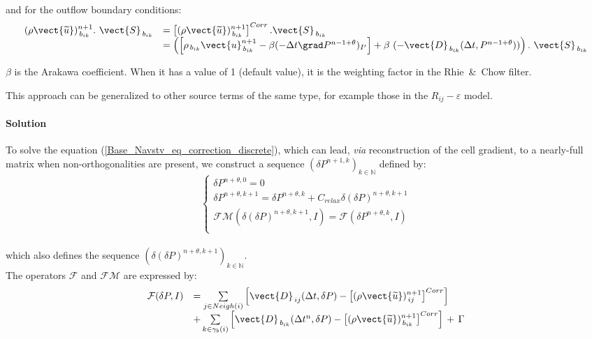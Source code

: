 and for the outflow boundary conditions:
\begin{equation}\notag
\begin{array}{ll}
(\rho \vect{\widetilde{u}})^{n+1}_{\,{b}_{ik}}.\ \vect{S}_{\,b_{ik}}& =
\left[(\rho \vect{\widetilde{u}})^{n+1}_{\,{b}_{ik}}\right]^{Corr}.\vect{S}_{\,b_{ik}}
\\&= \left( \left[\rho _{\,{b}_{ik}}\vect{u}^{n+1}_{\,{b}_{ik}}-\beta(-\Delta t
\grad P^{n-1+\theta})_{I'}\right]+\beta\ (-\vect{D}_{\,{b}_{ik}}(\Delta t,
P^{n-1+\theta}))\right).\ \vect{S}_{\,b_{ik}}
\end{array}
\end{equation}

$\beta$ is the Arakawa coefficient. When it has a value of 1 (default value), it is the weighting factor in the Rhie~\&~Chow filter.


This approach can be generalized to other source terms of the same type,
for example those in the $R_{ij}-\varepsilon$ model.

\paragraph{\bf Solution\\}
To solve the equation (\ref{Base_Navstv_eq_correction_discrete}), which can
lead, {\it via}  reconstruction of the cell gradient, to a nearly-full matrix
when non-orthogonalities are present, we construct a sequence
$(\delta P^{n+1,k})_{k\in \mathbb{N}}$ defined by:
\begin{equation}
\left\{\begin{array}{l}
\delta P^{n+\theta,0} = 0\\
\delta P^{n+\theta,k+1} = \delta P^{n+\theta,k} + C_{relax} \delta (\delta P)^{n+\theta,k+1}\\
\mathcal{FM}(\delta(\delta P)^{n+\theta,k+1},I) = \mathcal{F}(\delta P^{n+\theta,k},I) \\\end{array}\right.
\end{equation}\\
which also defines the sequence $({\delta(\delta P)^{n+\theta,k+1}})_{k\in
\mathbb{N}}$.\\
The operators $\mathcal{F}$ and $\mathcal{FM}$ are expressed by:
\begin{equation}
\begin{array}{ll}
\mathcal{F}(\delta P,I) &=
 \sum\limits_{j\in Neigh(i)}{\left[\vect{D}_{\,ij}(\Delta t,\delta
P)-\left[(\rho \vect{\widetilde{u}})^{n+1}_{\,ij}\right]^{Corr}\right]}\\
&+\sum\limits_{k\in {\gamma_b(i)}} {\left[\vect{D}_{\,{b}_{ik}}(\Delta
t^n,\delta P)-\left[(\rho \vect{\widetilde{u}})^{n+1}_{\,b_{ik}}\right]^{Corr}\right]\,+\,\Gamma}  \end{array}
\end{equation}

